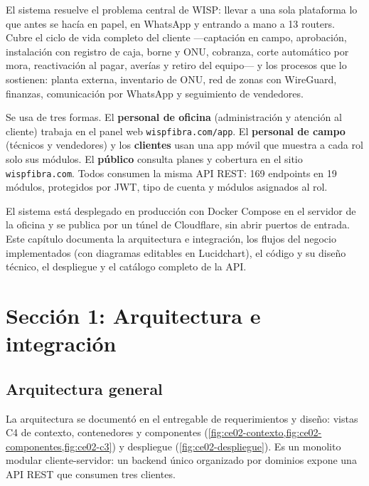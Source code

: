 El sistema resuelve el problema central de WISP: llevar a una sola plataforma lo que antes
se hacía en papel, en WhatsApp y entrando a mano a 13 routers. Cubre el ciclo de vida
completo del cliente ---captación en campo, aprobación, instalación con registro de caja,
borne y ONU, cobranza, corte automático por mora, reactivación al pagar, averías y retiro
del equipo--- y los procesos que lo sostienen: planta externa, inventario de ONU, red de
zonas con WireGuard, finanzas, comunicación por WhatsApp y seguimiento de vendedores.

Se usa de tres formas. El \textbf{personal de oficina} (administración y atención al
cliente) trabaja en el panel web \texttt{wispfibra.com/app}. El \textbf{personal de campo}
(técnicos y vendedores) y los \textbf{clientes} usan una app móvil que muestra a cada rol
solo sus módulos. El \textbf{público} consulta planes y cobertura en el sitio
\texttt{wispfibra.com}. Todos consumen la misma API REST: 169 endpoints en 19 módulos,
protegidos por JWT, tipo de cuenta y módulos asignados al rol.

El sistema está desplegado en producción con Docker Compose en el servidor de la oficina y
se publica por un túnel de Cloudflare, sin abrir puertos de entrada. Este capítulo documenta
la arquitectura e integración, los flujos del negocio implementados (con diagramas editables
en Lucidchart), el código y su diseño técnico, el despliegue y el catálogo completo de la
API.

\section{Sección 1: Arquitectura e integración}
\label{sec:ce02-e3-arq}

\subsection{Arquitectura general}

La arquitectura se documentó en el entregable de requerimientos y diseño: vistas C4 de
contexto, contenedores y componentes (\cref{fig:ce02-contexto,fig:ce02-componentes,fig:ce02-c3})
y despliegue (\cref{fig:ce02-despliegue}). Es un monolito modular cliente-servidor: un
backend único organizado por dominios expone una API REST que consumen tres clientes.

